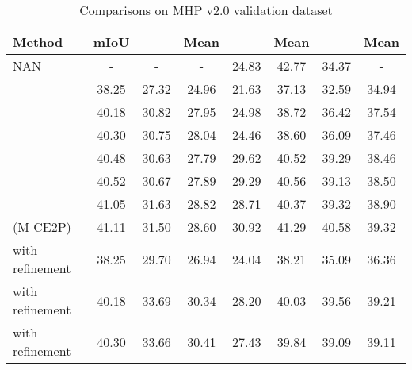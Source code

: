 \documentclass[letterpaper]{article} \usepackage{formatting-instructions-latex-2019}  \usepackage{times}  \usepackage{helvet}  \usepackage{courier}  \usepackage{url}  \usepackage{graphicx}  \frenchspacing  \setlength{\pdfpagewidth}{8.5in}  \setlength{\pdfpageheight}{11in}
\begin{document}
\begin{table*}[t]
    \footnotesize
    \begin{center}
        \caption{Comparisons on MHP v2.0 validation dataset} \label{tab:res_on_mhpv2}        
        \begin{tabular}{lccccccc}
            \toprule
            Method                               & mIoU        &     & Mean      &     & Mean      &      & Mean       \\
            \midrule
            NAN~\cite{Zhao2018}                    & -               & -               & -               & 24.83           & 42.77           & 34.37           & -               \\
            \bottomrule
                                         & 38.25          & 27.32          & 24.96          & 21.63          & 37.13          & 32.59          & 34.94          \\
                                      & 40.18          & 30.82          & 27.95          & 24.98          & 38.72          & 36.42          & 37.54          \\
                                        & 40.30          & 30.75          & 28.04          & 24.46          & 38.60          & 36.09          & 37.46          \\
            
            
                                    & 40.48          & 30.63          & 27.79          & 29.62          & 40.52          & 39.29          & 38.46          \\
                                      & 40.52          & 30.67          & 27.89          & 29.29          & 40.56          & 39.13          & 38.50          \\
                                   & 41.05          & 31.63          & 28.82          & 28.71          & 40.37          & 39.32          & 38.90          \\
            (M-CE2P)                     & 41.11          & 31.50          & 28.60          & 30.92          & 41.29          & 40.58          & 39.32          \\
            \midrule
             with refinement                 & 38.25          & 29.70          & 26.94          & 24.04          & 38.21          & 35.09          & 36.36          \\
             with refinement              & 40.18          & 33.69          & 30.34          & 28.20          & 40.03          & 39.56          & 39.21          \\
             with refinement                & 40.30          & 33.66          & 30.41          & 27.43          & 39.84          & 39.09          & 39.11          \\
            

\end{tabular}
\end{center}
\end{table*}
\end{document}
